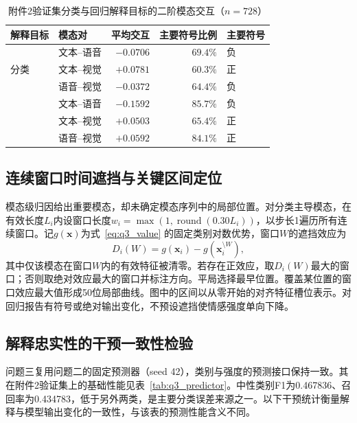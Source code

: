 \begin{table}[htbp]
\centering\small
\caption{附件2验证集分类与回归解释目标的二阶模态交互（$n=728$）}
\label{tab:q3_interaction}
\begin{tabular}{@{}llrrl@{}}
\toprule
解释目标 & 模态对 & 平均交互 & 主要符号比例 & 主要符号\\
\midrule
\multirow{3}{*}{分类} & 文本--语音 & $-0.0706$ & $69.4\%$ & 负\\
 & 文本--视觉 & $+0.0781$ & $60.3\%$ & 正\\
 & 语音--视觉 & $-0.0372$ & $64.4\%$ & 负\\
\addlinespace
\multirow{3}{*}{回归} & 文本--语音 & $-0.1592$ & $85.7\%$ & 负\\
 & 文本--视觉 & $+0.0503$ & $65.4\%$ & 正\\
 & 语音--视觉 & $+0.0592$ & $84.1\%$ & 正\\
\bottomrule
\end{tabular}
\end{table}

\subsection{连续窗口时间遮挡与关键区间定位}\label{subsec:q3_temporal}
模态级归因给出重要模态，却未确定模态序列中的局部位置。对分类主导模态，在有效长度$L_i$内设窗口长度$w_i=\max(1,\operatorname{round}(0.30L_i))$，以步长1遍历所有连续窗口。记$g(\mathbf x)$为式~\eqref{eq:q3_value} 的固定类别对数优势，窗口$W$的遮挡效应为
\begin{equation}
D_i(W)=g(\mathbf x_i)-g\!\left(\mathbf x_i^{\setminus W}\right),
\label{eq:q3_occlusion}
\end{equation}
其中仅该模态在窗口$W$内的有效特征被清零。若存在正效应，取$D_i(W)$最大的窗口；否则取绝对效应最大的窗口并标注方向。平局选择最早位置。覆盖某位置的窗口效应最大值形成50位局部曲线。图中的区间以从零开始的对齐特征槽位表示。对回归报告有符号或绝对输出变化，不预设遮挡使情感强度单向下降。

\subsection{解释忠实性的干预一致性检验}\label{subsec:q3_faithfulness}
问题三复用问题二的固定预测器（seed 42），类别与强度的预测接口保持一致。其在附件2验证集上的基础性能见表~\ref{tab:q3_predictor}。中性类别F1为0.467836、召回率为0.434783，低于另外两类，是主要分类误差来源之一。以下干预统计衡量解释与模型输出变化的一致性，与该表的预测性能含义不同。

